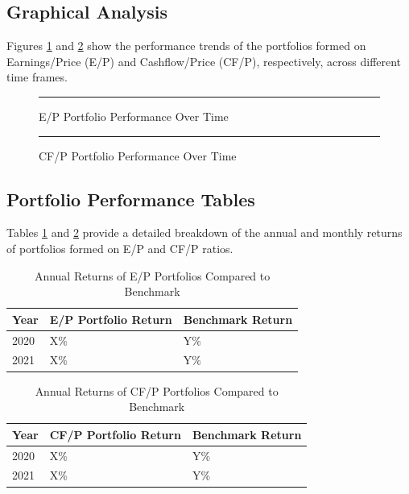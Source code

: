 \documentclass{article}
\begin{document}
\subsection*{Graphical Analysis}

Figures \ref{fig:graph1} and \ref{fig:graph2} show the performance trends of the portfolios formed on Earnings/Price (E/P) and Cashflow/Price (CF/P), respectively, across different time frames.

\begin{figure}[ht]
\centering
\rule{0.8\textwidth}{0.4\textwidth} %
\caption{E/P Portfolio Performance Over Time}
\label{fig:graph1}
\end{figure}

\begin{figure}[ht]
\centering
\rule{0.8\textwidth}{0.4\textwidth} %
\caption{CF/P Portfolio Performance Over Time}
\label{fig:graph2}
\end{figure}

\subsection*{Portfolio Performance Tables}

Tables \ref{tab:ep_performance} and \ref{tab:cfp_performance} provide a detailed breakdown of the annual and monthly returns of portfolios formed on E/P and CF/P ratios.

\begin{table}[ht]
\centering
\begin{tabular}{l|l|l}
Year & E/P Portfolio Return & Benchmark Return \\
\hline
2020 & X\% & Y\% \\
2021 & X\% & Y\% \\
\end{tabular}
\caption{Annual Returns of E/P Portfolios Compared to Benchmark}
\label{tab:ep_performance}
\end{table}

\begin{table}[ht]
\centering
\begin{tabular}{l|l|l}
Year & CF/P Portfolio Return & Benchmark Return \\
\hline
2020 & X\% & Y\% \\
2021 & X\% & Y\% \\
\end{tabular}
\caption{Annual Returns of CF/P Portfolios Compared to Benchmark}
\label{tab:cfp_performance}
\end{table}
\end{document}
